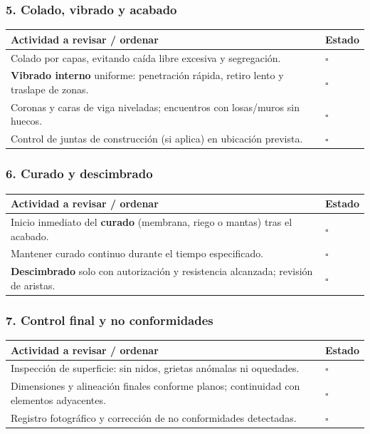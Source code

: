 \documentclass[12pt]{article}
\newcommand{\cbox}{\(\square\)}
\renewcommand{\cbox}{\(\square\)} %
\begin{document}
	\subsubsection*{5. Colado, vibrado y acabado}
	\begin{tabularx}{\linewidth}{>{\raggedright\arraybackslash}p{0.93\linewidth} >{\centering\arraybackslash}m{0.07\linewidth}}
		\toprule
		\textbf{Actividad a revisar / ordenar} & \textbf{Estado}\\
		\midrule
		Colado por capas, evitando caída libre excesiva y segregación. & \cbox \\
		\textbf{Vibrado interno} uniforme: penetración rápida, retiro lento y traslape de zonas. & \cbox \\
		Coronas y caras de viga niveladas; encuentros con losas/muros sin huecos. & \cbox \\
		Control de juntas de construcción (si aplica) en ubicación prevista. & \cbox \\
		\bottomrule
	\end{tabularx}
	
	\subsubsection*{6. Curado y descimbrado}
	\begin{tabularx}{\linewidth}{>{\raggedright\arraybackslash}p{0.93\linewidth} >{\centering\arraybackslash}m{0.07\linewidth}}
		\toprule
		\textbf{Actividad a revisar / ordenar} & \textbf{Estado}\\
		\midrule
		Inicio inmediato del \textbf{curado} (membrana, riego o mantas) tras el acabado. & \cbox \\
		Mantener curado continuo durante el tiempo especificado. & \cbox \\
		\textbf{Descimbrado} solo con autorización y resistencia alcanzada; revisión de aristas. & \cbox \\
		\bottomrule
	\end{tabularx}
	
	\subsubsection*{7. Control final y no conformidades}
	\begin{tabularx}{\linewidth}{>{\raggedright\arraybackslash}p{0.93\linewidth} >{\centering\arraybackslash}m{0.07\linewidth}}
		\toprule
		\textbf{Actividad a revisar / ordenar} & \textbf{Estado}\\
		\midrule
		Inspección de superficie: sin nidos, grietas anómalas ni oquedades. & \cbox \\
		Dimensiones y alineación finales conforme planos; continuidad con elementos adyacentes. & \cbox \\
		Registro fotográfico y corrección de no conformidades detectadas. & \cbox \\
		\bottomrule
	\end{tabularx}
	
\end{document}
